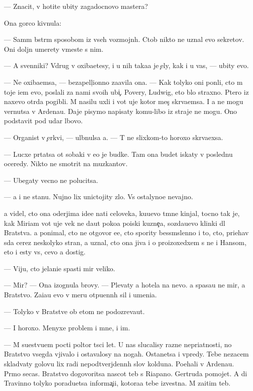 \documentclass[10pt]{book}
\begin{document}
— Znacit, v{\yi} hotite ubity zagadocnovo mastera?

Ona gor{\ia}co kivnula:

— Sam{\yi}m b{\yi}str{\yi}m sposobom iz vseh vozmojn{\yi}h. Ctob{\yi} nikto ne uznal {\y}evo sekretov. Oni doljn{\yi} umerety vmeste s nim.

— A sv{\ia}{\x}enniki? Vdrug v{\yi} oxiba{\y}etesy, i u nih taka{\y}a je {\c}ely, kak i u vas, — ubity {\y}evo.

— Ne oxiba{\y}emsa, — bezapell{\ia}{\c}ionno za{\y}avila ona. — Kak tolyko oni pon{\ia}li, cto m{\yi} toje i{\x}em {\y}evo, poslali za nami svo{\y}ih ubi{\y}{\c}. Povery, Ludwig, eto b{\yi}lo straxno. P{\ia}tero iz naxevo otr{\ia}da pogibli. M{\yi} nasilu uxli i vot uje kotor{\yi}{\y} mes{\ia}{\c} skr{\yi}va{\y}emsa. I {\y}a ne mogu vernutsa v Ardenau. Daje pisymo napisaty komu-libo iz straje{\y} ne mogu. Ono podstavit pod udar l{\iu}bovo.

— Organist v {\c}erkvi, — ul{\yi}bnulsa {\y}a. — T{\yi} ne slixkom-to horoxo skr{\yi}va{\y}exsa.

— Lucxe pr{\ia}tatsa ot sobaki v {\y}e{\y}o je budke. Tam ona budet iskaty v posledn{\iu}{\y}u oceredy. Nikto ne smotrit na muz{\yi}kantov.

— Ubegaty vecno ne polucitsa.

— {\Y}a i ne stanu. Nujno lix unictojity zlo. Vs{\e} ostalyno{\y}e nevajno.

{\Y}a videl, cto ona oderjima ide{\y}e{\y} na{\y}ti celoveka, ku{\y}u{\x}evo t{\e}mn{\yi}{\y}e kinjal{\yi}, tocno tak je, kak Miriam vot uje vek ne da{\y}ut poko{\y}a poiski kuzne{\c}a, sozda{\y}u{\x}evo klinki dl{\ia} Bratstva. {\Y}a ponimal, cto ne otgovor{\iu} {\y}e{\y}e, cto spority bessm{\yi}slenno i to, cto, pri{\y}ehav s{\iu}da cerez neskolyko stran, {\y}a uznal, cto ona jiva i o proizoxedxem s ne{\y} i Hansom, eto i {\y}esty vs{\e}, cevo {\y}a dostig.

— Viju, cto jelani{\y}e spasti mir veliko.

— Mir? — Ona izognula brovy. — Plevaty {\y}a hotela na nevo. {\Y}a spasa{\y}u ne mir, a Bratstvo. Za{\x}i{\x}a{\y}u {\y}evo v meru otpu{\x}enn{\yi}h sil i umeni{\y}a.

— Tolyko v Bratstve ob etom ne podozreva{\y}ut.

— I horoxo. Menyxe problem i mne, i im.

— M{\yi} su{\x}estvu{\y}em pocti poltor{\yi} t{\yi}s{\ia}ci let. U nas slucalisy razn{\yi}{\y}e nepri{\y}atnosti, no Bratstvo vsegda v{\yi}jivalo i ostavalosy na nogah. Ostanetsa i vpredy. Tebe nezacem sklad{\yi}vaty golovu lix radi nepodtverjdenn{\yi}h slov kolduna. Po{\y}ehali v Ardenau. Pr{\ia}mo se{\y}cas. Bratstvo dogovoritsa nascot teb{\ia} s Riapano. Gertruda pomojet. A di Travinno tolyko poradu{\y}etsa informa{\c}i{\y}i, kotora{\y}a tebe izvestna. M{\yi} za{\x}itim teb{\ia}.
\end{document}
